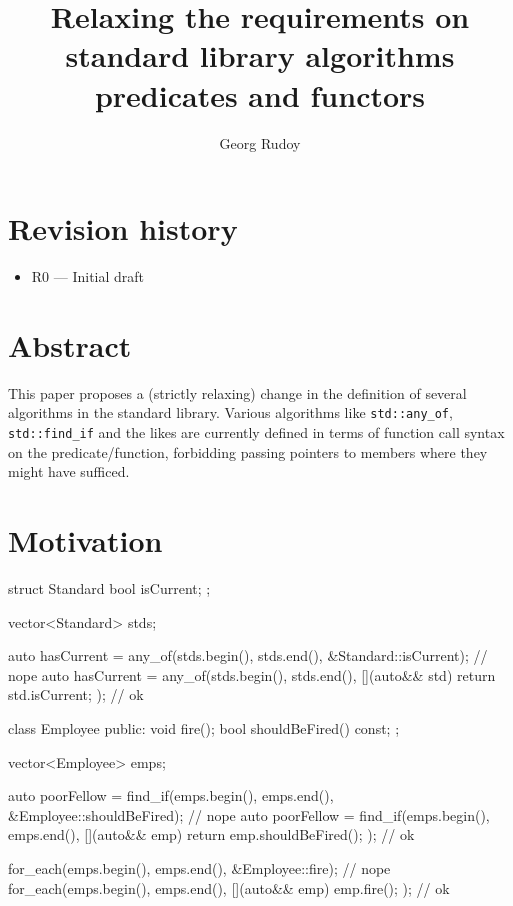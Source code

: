 \documentclass{wg21}
\title{Relaxing the requirements on standard library algorithms predicates and functors}
\author{Georg Rudoy}{georgii.rudoi@phystech.edu}
\newcommand{\cc}[1]{\texttt{#1}}
\begin{document}
\maketitle

\section{Revision history}
\begin{itemize}
  \item R0 --- Initial draft
\end{itemize}

\section{Abstract}

This paper proposes a (strictly relaxing) change in the definition of several
algorithms in the standard library. Various algorithms like \cc{std::any_of},
\cc{std::find_if} and the likes are currently defined in terms of function call
syntax on the predicate/function, forbidding passing pointers to members where
they might have sufficed.

\section{Motivation}

\begin{cpp}
  struct Standard
  {
      bool isCurrent;
  };

  vector<Standard> stds;

  auto hasCurrent = any_of(stds.begin(), stds.end(),
          &Standard::isCurrent);                                // nope
  auto hasCurrent = any_of(stds.begin(), stds.end(),
          [](auto&& std) { return std.isCurrent; });            // ok 


  class Employee
  {
  public:
      void fire();
      bool shouldBeFired() const;
  };

  vector<Employee> emps;

  auto poorFellow = find_if(emps.begin(), emps.end(),
          &Employee::shouldBeFired);                            // nope
  auto poorFellow = find_if(emps.begin(), emps.end(),
          [](auto&& emp) { return emp.shouldBeFired(); });      // ok

  for_each(emps.begin(), emps.end(), &Employee::fire);          // nope
  for_each(emps.begin(), emps.end(),
          [](auto&& emp) { emp.fire(); });                      // ok
\end{cpp}
\end{document}
